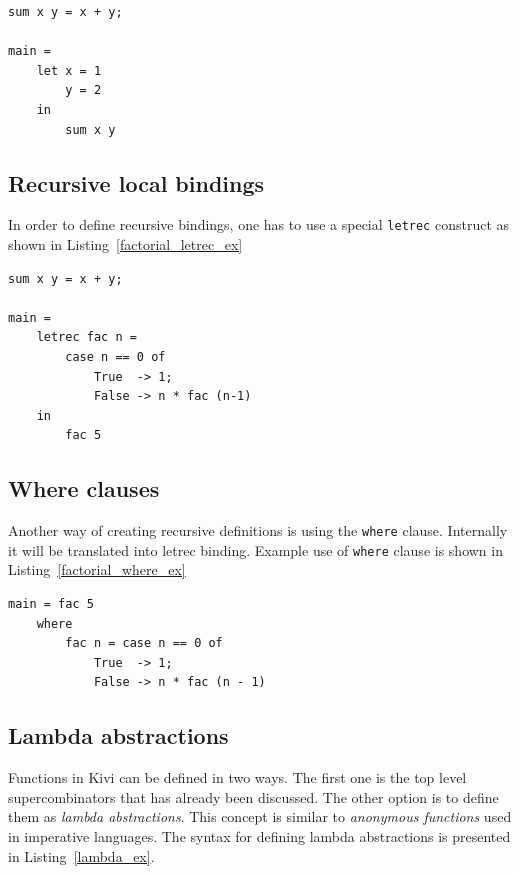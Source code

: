 \documentclass[12pt,a4paper]{report}
\begin{document}
\vspace*{0.2in}
\begin{lstlisting}[style=haskell,label=let_ex,caption={Local \texttt{let} binding.}]
sum x y = x + y;

main =
    let x = 1
        y = 2
    in
        sum x y
\end{lstlisting}

\subsection{Recursive local bindings}
In order to define recursive bindings, one has to use a special \texttt{letrec}
construct as shown in Listing~\ref{factorial_letrec_ex}

\vspace*{0.2in}
\begin{lstlisting}[style=haskell,label=factorial_letrec_ex,caption={Factorial function using \texttt{letrec}.}]
sum x y = x + y;

main =
    letrec fac n =
        case n == 0 of
            True  -> 1;
            False -> n * fac (n-1)
    in
        fac 5
\end{lstlisting}

\subsection{Where clauses}
Another way of creating recursive definitions is using the \texttt{where}
clause. Internally it will be translated into letrec binding. Example use of
\texttt{where} clause is shown in Listing~\ref{factorial_where_ex}

\vspace*{0.2in}
\begin{lstlisting}[style=haskell,label=factorial_where_ex,caption={Factorial function using \texttt{where}.}]
main = fac 5
    where
        fac n = case n == 0 of
            True  -> 1;
            False -> n * fac (n - 1)
\end{lstlisting}

\subsection{Lambda abstractions}
Functions in Kivi can be defined in two ways. The first one is the top level
supercombinators that has already been discussed. The other option is to define
them as \textit{lambda abstractions}. This concept is similar to \textit{anonymous
functions} used in imperative languages. The syntax for defining lambda
abstractions is presented in Listing~\ref{lambda_ex}.
\end{document}
